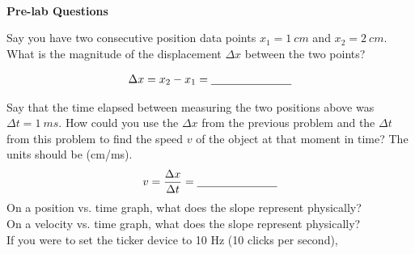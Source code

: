 \textbf{\\\Large Pre-lab Questions\\}

\begin{questions}

\question[\half] Say you have two consecutive position data points $x_1=\SI{1}{cm}$ and $x_2=\SI{2}{cm}$. What is the magnitude of the displacement $\Delta x$ between the two points?
\qsp

\begin{align*}
\Delta x = x_2 - x_1 = \underline{\hspace{2.5cm}}
\end{align*}

\question[\half] Say that the time elapsed between measuring the two positions above was $\Delta t=\SI{1}{ms}$. How could you use the $\Delta x$ from the previous problem and the $\Delta t$ from this problem to find the speed $v$ of the object at that moment in time? The units should be (cm/ms). \\[0.5cm]
\begin{align*}
v = \frac{\Delta x}{\Delta t} = \underline{\hspace{2.5cm}}
\end{align*}
\newline
\question[\half] On a position vs. time graph, what does the slope represent physically?\\[2.5cm]

\question[\half] On a velocity vs. time graph, what does the slope represent physically?\\[2.5cm]

\question[1] If you were to set the ticker device to 10 Hz (10 clicks per second),



\end{questions}
